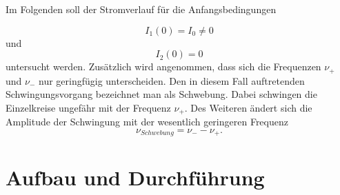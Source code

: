 \documentclass[11pt,ngerman,a4paper]{article}
\begin{document}
\noindent

Im Folgenden soll der Stromverlauf für die Anfangsbedingungen

\[
I_1(0) = I_0 \neq 0
\] 
und 
\[
I_2(0) = 0
\]
untersucht werden. Zusätzlich wird angenommen, dass sich die Frequenzen $\nu_+$  und $\nu_-$ nur geringfügig unterscheiden. Den in diesem Fall auftretenden Schwingungsvorgang bezeichnet man als Schwebung. Dabei schwingen die Einzelkreise ungefähr mit der Frequenz $\nu_+$. Des Weiteren ändert sich die Amplitude der Schwingung mit der wesentlich geringeren Frequenz 
\begin{equation}
\nu_{Schwebung} = \nu_- - \nu_+.
\end{equation}

\section{Aufbau und Durchf\"{u}hrung}
\end{document}
